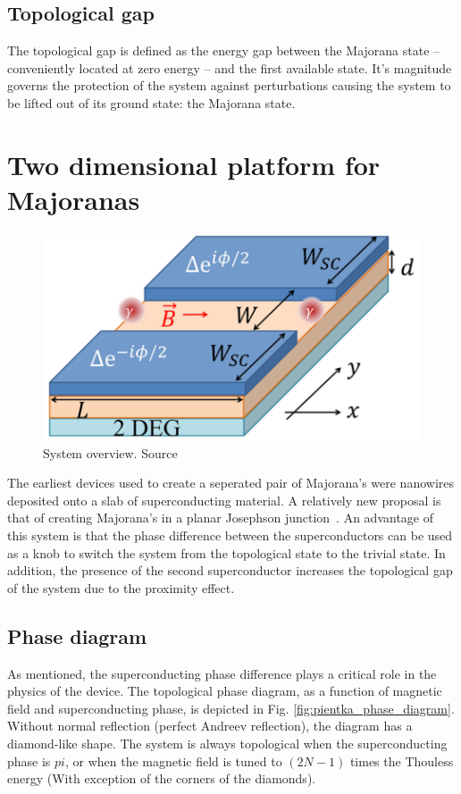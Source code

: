 	\subsection{Topological gap}
		The topological gap is defined as the energy gap between the Majorana state -- conveniently located at zero energy -- and the first available state.
		It's magnitude governs the protection of the system against perturbations causing the system to be lifted out of its ground state: the Majorana state.

\section{Two dimensional platform for Majoranas}

	\begin{figure}[!htb]
	\centering
	\includegraphics[width=0.5\columnwidth]{figures/pientka_system}
	\caption{System overview. Source\cite{pientka_topological_2017}}
	\label{fig:pientka_system}
	\end{figure}

	The earliest devices used to create a seperated pair of Majorana's were nanowires deposited onto a slab of superconducting material.
	A relatively new proposal is that of creating Majorana's in a planar Josephson junction~\cite{pientka_topological_2017}.
	An advantage of this system is that the phase difference between the superconductors can be used as a knob to switch the system from the topological state to the trivial state. 
	In addition, the presence of the second superconductor increases the topological gap of the system due to the proximity effect.

			

	\subsection{Phase diagram}
	As mentioned, the superconducting phase difference plays a critical role in the physics of the device.
	The topological phase diagram, as a function of magnetic field and superconducting phase, is depicted in Fig. \ref{fig:pientka_phase_diagram}.
	Without normal reflection (perfect Andreev reflection), the diagram has a diamond-like shape.
	The system is always topological when the superconducting phase is $pi$, or when the magnetic field is tuned to $(2N-1)$ times the Thouless energy (With exception of the corners of the diamonds).
	
